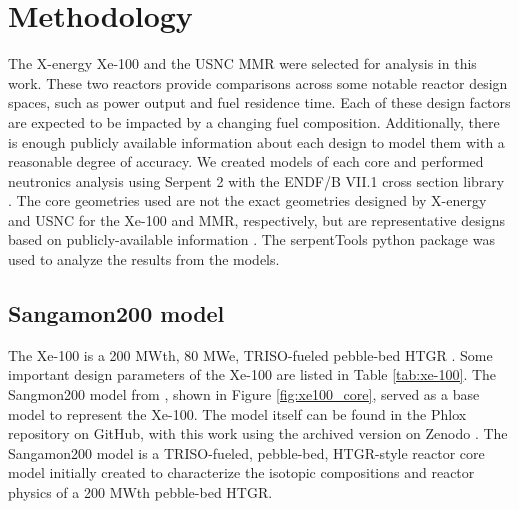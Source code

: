 \section{Methodology}
The X-energy Xe-100 and 
the \gls*{USNC} \gls*{MMR} were selected for analysis in this work. These two reactors provide comparisons across 
some notable reactor design spaces, such as power output
and fuel residence time. Each of these design factors are expected to 
be impacted by a changing fuel composition. 
Additionally, there is enough publicly available information about 
each design to model them with a reasonable degree of accuracy. 
We created models of each core and performed neutronics analysis using 
Serpent 2\cite{leppanen_serpent_2015} with the 
ENDF/B VII.1 cross section library \cite{chadwick_endfb-vii1_2011}.
The core geometries used are not 
the exact geometries designed by X-energy and \gls*{USNC} for the 
Xe-100 and \gls*{MMR}, respectively, but 
are representative designs based on publicly-available information 
\cite{mulder_overview_2021,noauthor_usnc_2021,hawari_development_2018,venneri_micro_2019}. 
The serpentTools python package \cite{johnson_serpenttools_2020} 
was used to 
analyze the results from the models.

\subsection{Sangamon200 model} \label{sec:xe100_serpent_model}
The Xe-100 is a 200 MWth, 80 MWe, \acrfull*{TRISO}-fueled pebble-bed 
\gls*{HTGR} \cite{mulder_overview_2021}. Some important design parameters 
of the Xe-100 are listed in Table \ref{tab:xe-100}. 
The Sangmon200 model from \cite{richter_isotopic_2022}, shown in 
Figure \ref{fig:xe100_core}, served as a base model 
to represent the Xe-100. The model itself can be 
found in the Phlox repository on GitHub, with this work using 
the archived version on Zenodo \cite{richter_zoerichterphlox_2022}.
The Sangamon200 model is a \gls*{TRISO}-fueled, pebble-bed, \gls*{HTGR}-style 
reactor core model initially created to characterize the isotopic 
compositions and reactor physics of a 200 MWth pebble-bed \gls*{HTGR}. 

